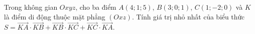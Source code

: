 \begin{ex}
Trong không gian $Oxyz$, cho ba điểm $A(4;1;5)$, $B(3;0;1)$, $C(1;-2;0)$ và $K$ là điểm di động thuộc mặt phẳng $(Oxz)$. Tính giá trị nhỏ nhất của biểu thức $S=\overrightarrow{KA}\cdot\overrightarrow{KB}+\overrightarrow{KB}\cdot\overrightarrow{KC}+\overrightarrow{KC}\cdot\overrightarrow{KA}$.
\end{ex}
